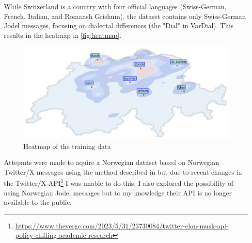 While Switzerland is a country with four official languages (Swiss-German, French, Italian, and Romansh Grishum), the dataset contains only Swiss-German Jodel messages, focusing on dialectal differences (the "Dial" in VarDial). This results in the heatmap in \autoref{fig:heatmap}.

\begin{figure}
    \centering
    \includegraphics[width=\textwidth]{./figs/heatmap.png}
    \caption{Heatmap of the training data}
    \label{fig:heatmap}
\end{figure}

Attepmts were made to aquire a Norwegian dataset based on Norwegian Twitter/X messages using the method described in \cite{ljubesicTweetGeoToolCollecting2016} but due to recent changes in the Twitter/X API\footnote{\url{https://www.theverge.com/2023/5/31/23739084/twitter-elon-musk-api-policy-chilling-academic-research}} I was unable to do this. I also explored the possibility of using Norwegian Jodel messages but to my knowledge their API is no longer available to the public.